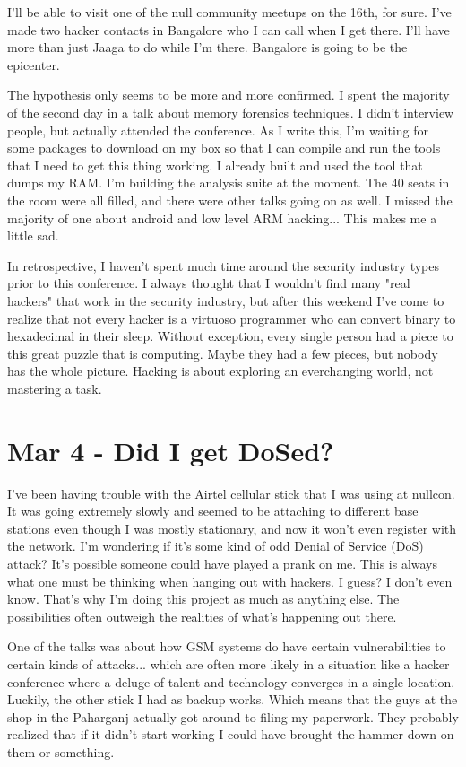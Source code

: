 \documentclass[11pt]{amsart}
\begin{document}
I'll be able to visit one of the null community meetups on the 16th, for sure. I've made two hacker contacts in Bangalore who I can call when I get there. I'll have more than just Jaaga to do while I'm there. Bangalore is going to be the epicenter.

The hypothesis only seems to be more and more confirmed. I spent the majority of the second day in a talk about memory forensics techniques. I didn't interview people, but actually attended the conference. As I write this, I'm waiting for some packages to download on my box so that I can compile and run the tools that I need to get this thing working. I already built and used the tool that dumps my RAM. I'm building the analysis suite at the moment. The 40 seats in the room were all filled, and there were other talks going on as well. I missed the majority of one about android and low level ARM hacking...  This makes me a little sad.

In retrospective, I haven't spent much time around the security industry types prior to this conference. I always thought that I wouldn't find many "real hackers" that work in the security industry, but after this weekend I've come to realize that not every hacker is a virtuoso programmer who can convert binary to hexadecimal in their sleep. Without exception, every single person had a piece to this great puzzle that is computing. Maybe they had a few pieces, but nobody has the whole picture. Hacking is about exploring an everchanging world, not mastering a task.

\section{Mar 4 - Did I get DoSed?}

I've been having trouble with the Airtel cellular stick that I was using at nullcon. It was going extremely slowly and seemed to be attaching to different base stations even though I was mostly stationary, and now it won't even register with the network. I'm wondering if it's some kind of odd Denial of Service (DoS) attack? It's possible someone could have played a prank on me. This is always what one must be thinking when hanging out with hackers. I guess? I don't even know. That's why I'm doing this project as much as anything else. The possibilities often outweigh the realities of what's happening out there.

One of the talks was about how GSM systems do have certain vulnerabilities to certain kinds of attacks...  which are often more likely in a situation like a hacker conference where a deluge of talent and technology converges in a single location. Luckily, the other stick I had as backup works. Which means that the guys at the shop in the Paharganj actually got around to filing my paperwork. They probably realized that if it didn't start working I could have brought the hammer down on them or something.
\end{document}

